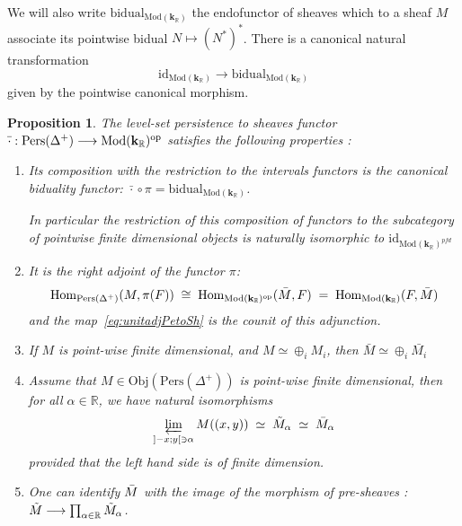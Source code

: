 \documentclass[a4paper, english, 11pt]{article}
\newcommand{\kk}[0]{\textbf{k}}
\newcommand{\Mod}[0]{\text{Mod}}
\newcommand{\Pe}{\text{Pers}}
\newcommand{\0}{\vec{0}}
\newcommand{\R}[0]{\mathbb{R}}
\newcommand{\Obj}[0]{\text{Obj}}
\newcommand{\op}[0]{\text{op}}
\newcommand{\Hom}[0]{\text{Hom}}
\newtheorem{prop}{Proposition}[section]
\begin{document}
We will also write $\text{bidual}_{\Mod(\kk_\R)}$ the endofunctor of  sheaves  which to a sheaf $M$ 
associate its pointwise bidual $N\mapsto (N^*)^*$. There is a canonical natural transformation 
\begin{equation}\label{eq:unitadjPetoSh} \text{id}_{\Mod(\kk_\R)} \to \text{bidual}_{\Mod(\kk_\R)}\end{equation} given by the pointwise canonical morphism.
\begin{prop}\label{P:PropertiesofBar}
The level-set persistence to sheaves functor $\Bar{\cdot} : \Pe(\Delta^+)\longrightarrow \Mod (\kk_\R)^{\op}$ satisfies the following properties : 
\begin{enumerate}
    \item Its composition  with the restriction to the intervals functors is the canonical biduality functor: $\bar{\cdot}\circ \pi = \text{bidual}_{\Mod(\kk_\R)}$. 
    
    In particular the restriction of this composition of functors to the subcategory of pointwise finite dimensional objects is naturally isomorphic to $\text{id}_{\Mod(\kk_\R)^{pfd}}$
    \item It is the right adjoint of the functor $\pi$: 
    $$\Hom_{\Pe(\Delta^+)}(M, \pi(F)) \; \cong \; \Hom_{\Mod(\kk_\R)^{\op}}(\Bar{M}, F)\; = \; \Hom_{\Mod(\kk_\R)}(F,\Bar{M}) $$ and the map~\eqref{eq:unitadjPetoSh} is the counit of this adjunction.
    \item If $M$ is point-wise finite dimensional, and $M \simeq \oplus_i M_i$, then $\bar{M} \simeq \oplus_i \bar{M_i} $
    \item Assume that $M \in \Obj(\Pe(\Delta^{+}))$ is point-wise finite dimensional, then for all $\alpha \in \R$, we have natural isomorphisms  $$ \varprojlim_{]-x;y[\ni \alpha}M((x,y)) \;\simeq\; \tilde{M}_{\alpha}\; \simeq \; \bar{M}_{\alpha}$$ provided that the left hand side is of finite dimension.
    
    \item One can identify $\Bar{M}$ with the image of the morphism of pre-sheaves : $\Tilde{M}\longrightarrow \prod_{\alpha\in\R}\Tilde{M}_{\alpha} $.
\end{enumerate}

\end{prop}
\end{document}
